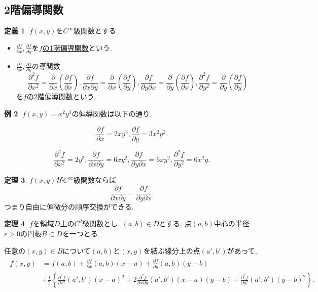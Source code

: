 \documentclass[dvipdfmx,a4paper,11pt]{article}
\theoremstyle{definition}
\newtheorem{thm}{定理}
\newtheorem{dfn}[thm]{定義}
\newtheorem{exa}[thm]{例}
\newcommand{\pdrv}[2]{\frac{\partial #1}{\partial #2}}
\newcommand{\ppdrv}[3]{\frac{\partial #1}{\partial #2 \partial #3}}
\begin{document}
\subsection{2階偏導関数}

\begin{tcolorbox}[
    colback = white,
    colframe = green!35!black,
    fonttitle = \bfseries,
    breakable = true]
    \begin{dfn}
$f(x,y)$を$C^{\infty}$級関数とする.
\begin{itemize}
\item $\pdrv{f}{x} , \pdrv{f}{y}$を\underline{$f$の1階偏導関数}という.
\item $\pdrv{f}{x} , \pdrv{f}{y}$の導関数
$$
\pdrv{^2f}{x^2} = \pdrv{}{x}\left( \pdrv{f}{x} \right), 
\ppdrv{f}{x}{y} =\pdrv{}{x}\left( \pdrv{f}{y} \right), 
\ppdrv{f}{y}{x} =\pdrv{}{y}\left( \pdrv{f}{x} \right), 
\pdrv{^2f}{y^2} = \pdrv{}{y}\left( \pdrv{f}{y} \right)
$$
を\underline{$f$の2階偏導関数}という.
\end{itemize}

    \end{dfn}
    \end{tcolorbox}

\begin{exa}
$f(x,y) = x^2 y^3$の偏導関数は以下の通り.

$$
\pdrv{f}{x}=2xy^3,  \pdrv{f}{y}=3x^2y^2.
$$

$$
\pdrv{^2f}{x^2} = 2y^3, 
\ppdrv{f}{x}{y} =6xy^2, 
\ppdrv{f}{y}{x} =6xy^2, 
\pdrv{^2f}{y^2} = 6x^2y.
$$
\end{exa}

\begin{tcolorbox}[
    colback = white,
    colframe = green!35!black,
    fonttitle = \bfseries,
    breakable = true]
    \begin{thm}
$f(x,y)$が$C^\infty$級関数ならば
$$
\ppdrv{f}{x}{y} =\ppdrv{f}{y}{x}.
$$
つまり自由に偏微分の順序交換ができる.
    \end{thm}
    \end{tcolorbox}


\begin{tcolorbox}[
    colback = white,
    colframe = green!35!black,
    fonttitle = \bfseries,
    breakable = true]
    \begin{thm}
    $f$を領域$D$上の$C^2$級関数とし, $(a,b)  \in D$とする.
    点$(a,b)$中心の半径$r>0$の円板$B \subset D$を一つとる.
    
    任意の$(x,y) \in B$について$(a,b)$と$(x,y) $を結ぶ線分上の点$(a',b')$があって,
  \begin{align*}
  \begin{split}
  f(x,y) &= f(a,b) + \pdrv{f}{x}(a,b)(x-a) + \pdrv{f}{y}(a,b)(y-b) \\
  &+ \frac{1}{2} \left\{  \pdrv{^2f}{x^2}(a',b')(x-a)^2 +2 \ppdrv{^2f}{x}{y}(a',b')(x-a)(y-b)+
   \pdrv{^2f}{y^2}(a',b')(y-b) ^2    \right\}.
    \end{split}
  \end{align*}

    \end{thm}
    \end{tcolorbox}
    
\end{document}

